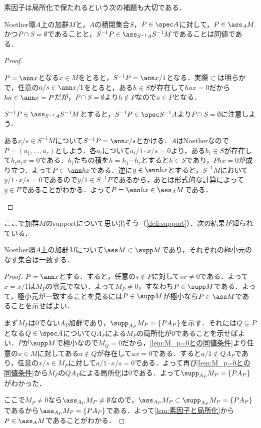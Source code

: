 素因子は局所化で保たれるという次の補題も大切である．

\begin{lem}\label{lem:素因子と局所化}
	Noether環$A$上の加群$M$と，$A$の積閉集合$S$，$P\in\spec A$に対して，$P\in\ass_A M$かつ$P\cap S=\emptyset$であることと，$S^{-1}P\in\ass_{S^{-1}A} S^{-1}M$であることは同値である．
\end{lem}

\begin{proof}
	\begin{eqv}
		\item 
		$P=\ann x$となる$x\in M$をとると，$S^{-1}P=\ann x/1$となる．実際$\subset$は明らかで，任意の$a/s\in\ann x/1$をとると，ある$h\in S$が存在して$hax=0$だから$ha\in\ann x=P$だが，$P\cap S=\emptyset$より$h\not\in P$なので$a\in P$となる．
		
		\item 
		$S^{-1}P\in\ass_{S^{-1}A}S^{-1}M$とすると，$S^{-1}P\in\spec S^{-1}A$より$P\cap S=\emptyset$に注意しよう．
	
		ある$x/s\in S^{-1}M$について$S^{-1}P=\ann x/s$とかける．$A$はNoetherなので$P=(a_1,\dots,a_r)$としよう．各$a_i$について$a_i/1\cdot x/s=0$より，ある$h_i\in S$が存在して$h_ia_ix=0$である．$h_i$たちの積を$h=h_1\cdots h_r$とすると$h\in S$であり，$Phx=0$が成り立つ．よって$P\subset\ann hx$である．逆に$y\in\ann hx$とすると，$S^{-1}M$において$y/1\cdot x/s=0$であるので$y/1\in S^{-1}P$であるから，あとは形式的な計算によって$y\in P$であることがわかる．よって$P=\ann hx\in\ass_A M$である．
	\end{eqv}
\end{proof}

ここで加群$M$のsupportについて思い出そう（\ref{defi:support}）．次の結果が知られている．
\begin{thm}\label{thm:assとsuppの極小元}
	Noether環$A$上の加群$M$について$\ass M\subset\supp M$であり，それぞれの極小元のなす集合は一致する．
\end{thm}

\begin{proof}
	$ P=\ann x$とする．すると，任意の$s
	\not\in P$に対して$sx\neq0$である．よって$x=x/1$は$M_ P$の零元でない．よって$M_ P\neq0$，すなわち$ P\in\supp M$である．よって，極小元が一致することを見るには$P\in\supp M$が極小なら$P\in\ass M$であることを示せばよい．
	
	まず$M_P$は$0$でない$A_P$加群であり，$\supp_{A_P} M_P=\{PA_P\}$を示す．それには$Q\subsetneq P$となる$Q\in\spec A$について$QA_P$による$M_P$の局所化が$0$であることを示せばよい．$P$が$\supp M$で極小なので$M_Q=0$だから，\ref{lem:M_p=0との同値条件}より任意の$x\in M$に対してある$a\not\in Q$が存在して$ax=0$である．すると$a/1\not\in QA_P$であり，任意の$x/s\in M_P$に対して$a/1\cdot x/s=0$である．よって再び\ref{lem:M_p=0との同値条件}から$M_P$の$QA_P$による局所化は$0$である．よって$\supp_{A_P} M_P=\{PA_P\}$がわかった．
	
	ここで$M_P\neq0$なら$\ass_{A_P}M_P\neq\emptyset$なので，$\ass_{A_P}M_P\subset\supp_{A_P}M_P=\{PA_P\}$であるから$\ass_{A_P}M_P=\{PA_P\}$である．よって\ref{lem:素因子と局所化}から$P\in\ass_A M$であることがわかる．
\end{proof}

